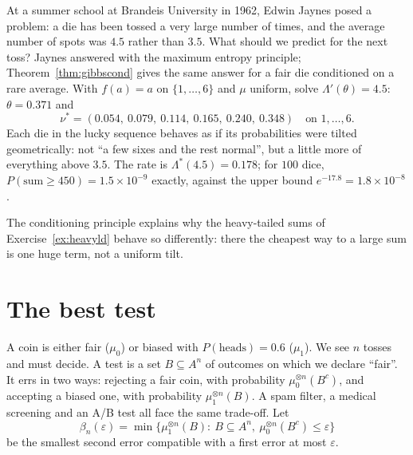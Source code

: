 \begin{example}\label{ex:brandeis}
At a summer school at Brandeis University in 1962, Edwin Jaynes posed a problem: a die has been tossed a very large number of times, and the average number of
spots was $4.5$ rather than $3.5$. What should we predict for the next toss? Jaynes answered with the maximum entropy principle; Theorem~\ref{thm:gibbscond} gives the
same answer for a fair die conditioned on a rare average. With $f(a)=a$ on $\{1,\dots,6\}$ and $\mu$ uniform, solve $\Lambda'(\theta)=4.5$: $\theta=0.371$ and
\[
\nu^*=(0.054,\ 0.079,\ 0.114,\ 0.165,\ 0.240,\ 0.348)\quad\text{on }1,\dots,6.
\]
Each die in the lucky sequence behaves as if its probabilities were tilted geometrically: not ``a few sixes and the rest normal'', but a little more of everything above
$3.5$. The rate is $\Lambda^*(4.5)=0.178$; for $100$ dice, $P(\text{sum}\ge450)=1.5\times10^{-9}$ exactly, against the upper bound $e^{-17.8}=1.8\times10^{-8}$.
\end{example}

The conditioning principle explains why the heavy-tailed sums of Exercise~\ref{ex:heavyld} behave so differently: there the cheapest way to a large sum is one huge
term, not a uniform tilt.

\section{The best test}

A coin is either fair ($\mu_0$) or biased with $P(\text{heads})=0.6$ ($\mu_1$). We see $n$ tosses and must decide. A test is a set $B\subseteq A^n$ of outcomes on which we
declare ``fair''. It errs in two ways: rejecting a fair coin, with probability $\mu_0^{\otimes n}(B^c)$, and accepting a biased one, with probability $\mu_1^{\otimes n}(B)$. A spam filter,
a medical screening and an A/B test all face the same trade-off. Let
\[
\beta_n(\varepsilon)=\min\bigl\{\mu_1^{\otimes n}(B):\ B\subseteq A^n,\ \mu_0^{\otimes n}(B^c)\le\varepsilon\bigr\}
\]
be the smallest second error compatible with a first error at most $\varepsilon$.

